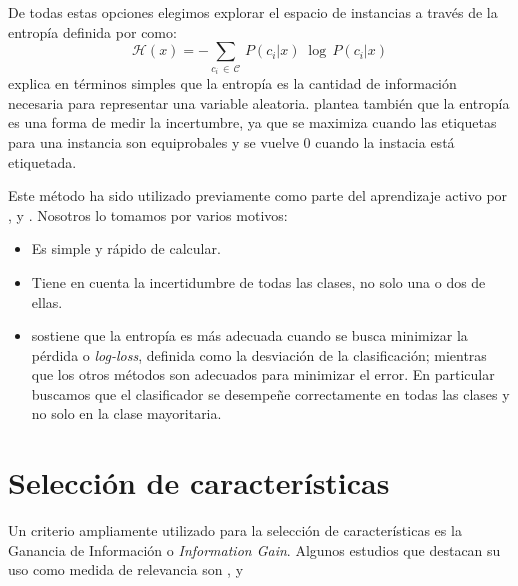 De todas estas opciones elegimos explorar el espacio de instancias a través de la entropía definida por \citet{entropy-shannon} como:
\begin{equation*}
\mathcal{H}(x) = - \sum_{c_i\,\in\,\mathcal{C}} \, P(c_i|x)\; \log\,P(c_i|x)
\end{equation*}
\citet{information-theory-cover} explica en términos simples que la entropía es la cantidad de información necesaria para representar una variable aleatoria. \citet{multinomial-manning} plantea también que la entropía es una forma de medir la incertumbre, ya que se maximiza cuando las etiquetas para una instancia son equiprobales y se vuelve 0 cuando la instacia está etiquetada.

Este método ha sido utilizado previamente como parte del aprendizaje activo por \citet{entropy-or}, \citet{settles-entropy} y \citet{Hwa-entropy}. Nosotros lo tomamos por varios motivos:
\begin{itemize}
    \item Es simple y rápido de calcular.
    \item Tiene en cuenta la incertidumbre de todas las clases, no solo una o dos de ellas.
    \item \citet{settles_active_learning_survey} sostiene que la entropía es más adecuada cuando se busca minimizar la pérdida o \textit{log-loss}, definida como la desviación de la clasificación; mientras que los otros métodos son adecuados para minimizar el error. En particular buscamos que el clasificador se desempeñe correctamente en todas las clases y no solo en la clase mayoritaria.
\end{itemize}



\section{Selección de características}

Un criterio ampliamente utilizado para la selección de características es la Ganancia de Información o \textit{Information Gain}. Algunos estudios que destacan su uso como medida de relevancia son \citet{dualist}, \citet{forman-ig} y \citet{Sebastiani-text-categorization}

